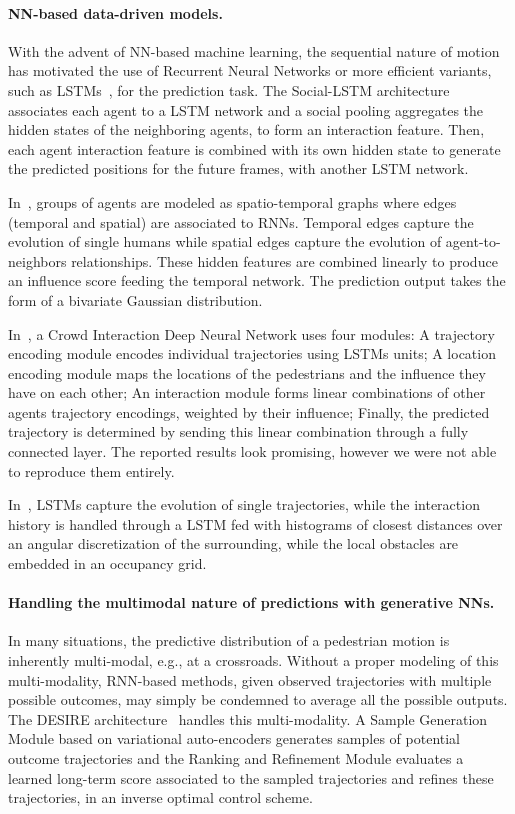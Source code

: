 \documentclass[10pt,twocolumn,letterpaper]{article}
\begin{document}
\vspace{-0.4cm}
\paragraph{NN-based data-driven models.} With the advent of NN-based machine learning, the sequential nature of motion has motivated the use of Recurrent Neural Networks or more efficient variants, such as LSTMs~\cite{Graves2014}, for the prediction task. The Social-LSTM architecture~\cite{SocialLSTM2016} associates each agent to a LSTM network and a social pooling aggregates the hidden states of the neighboring agents, to form an interaction feature. Then, each agent interaction feature is combined with its own hidden state to generate the predicted positions for the future frames, with another LSTM network.



In~\cite{SocialAttention2018Vemula}, groups of agents are modeled as spatio-temporal graphs where edges (temporal and spatial) are associated to RNNs. Temporal edges capture the evolution of single humans while spatial edges capture the evolution of agent-to-neighbors relationships. These hidden features are combined linearly to produce an influence score feeding the temporal network. The prediction output takes the form of a bivariate Gaussian distribution. 

In~\cite{CIDNN2018}, a Crowd Interaction Deep Neural Network uses four modules: A trajectory encoding module encodes individual trajectories using LSTMs units; A location encoding module maps the locations of the pedestrians and the influence they have on each other; An interaction module forms linear combinations of other agents trajectory encodings, weighted by their influence; Finally, the predicted trajectory is determined by sending this linear combination through a fully connected layer. The reported results look promising, however we were not able to reproduce them entirely.

In~\cite{Pfeiffer2018}, LSTMs capture the evolution of single trajectories, while the interaction history is handled through a LSTM fed with histograms of closest distances over an angular discretization of the surrounding, while the local obstacles are embedded in an occupancy grid.

\vspace{-0.3cm}
\paragraph{Handling the multimodal nature of predictions with generative NNs.} In many situations, the predictive distribution of a pedestrian motion is inherently multi-modal, e.g., at a crossroads. Without a proper modeling of this multi-modality, RNN-based methods, given observed trajectories with multiple possible outcomes, may simply be condemned to average all the possible outputs. The DESIRE architecture~\cite{DESIRE2017} handles this multi-modality. A Sample Generation Module based on variational auto-encoders generates samples of potential outcome trajectories and the Ranking and Refinement Module evaluates a learned long-term score associated to the sampled trajectories and refines these trajectories, in an inverse optimal control scheme.
\end{document}
